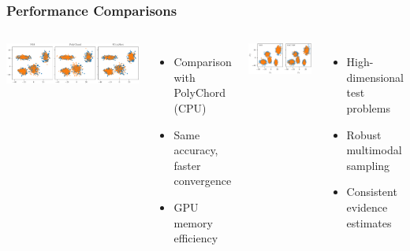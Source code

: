 \documentclass[aspectratio=169]{beamer}
\begin{document}
\begin{frame}
    \frametitle{Performance Comparisons}
    \begin{columns}
        \includegraphics[width=\textwidth]{figures/pc_comparison}
        \vspace{5pt}
        \begin{itemize}
            \item Comparison with PolyChord (CPU)
            \item Same accuracy, faster convergence
            \item GPU memory efficiency
        \end{itemize}
        \includegraphics[width=\textwidth]{figures/mixture_gaussians_high_dim}
        \vspace{5pt}
        \begin{itemize}
            \item High-dimensional test problems
            \item Robust multimodal sampling
            \item Consistent evidence estimates
        \end{itemize}
    \end{columns}
\end{frame}
\end{document}

